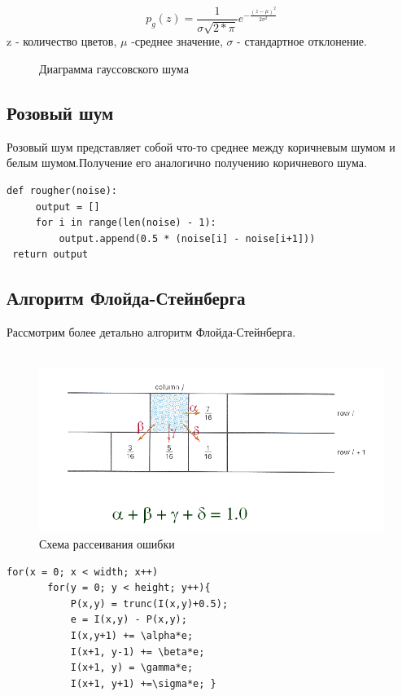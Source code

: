  \begin{equation}
 p_g(z)=\frac{1}{\sigma\sqrt{2*\pi}}e^{-\frac{(z-\mu)^2}{2\sigma^2}}
 \end{equation}
 z - количество цветов, $\mu$ -среднее значение, $\sigma$ - стандартное отклонение.
  \begin{figure}
  	\centering
  	\caption{Диаграмма гауссовского шума}
  	\label{fig:spire02}
  \end{figure}
 \subsection{Розовый шум}
 Розовый шум представляет собой что-то среднее между коричневым шумом и белым шумом.Получение его аналогично получению коричневого шума.
 \begin{lstlisting}[style=pseudocode,caption={Получение розового шума}]
 def rougher(noise):
     output = []
     for i in range(len(noise) - 1):
         output.append(0.5 * (noise[i] - noise[i+1]))
 return output
 \end{lstlisting}
 \subsection{Алгоритм Флойда-Стейнберга}
 Рассмотрим более детально алгоритм Флойда-Стейнберга.
\\\\
 \begin{figure}
 	\centering
 	 \includegraphics[width=\textwidth]{img/1.png}
 	\caption{Схема рассеивания ошибки}
 	\label{fig:spire03}
 \end{figure}
 
   \begin{lstlisting}[style=pseudocode,caption={Алгоритм Флойда-Стейнберга}]
   for(x = 0; x < width; x++)
       for(y = 0; y < height; y++){
           P(x,y) = trunc(I(x,y)+0.5);
           e = I(x,y) - P(x,y);
           I(x,y+1) += \alpha*e;
           I(x+1, y-1) += \beta*e;
           I(x+1, y) = \gamma*e;
           I(x+1, y+1) +=\sigma*e; }
   \end{lstlisting}

